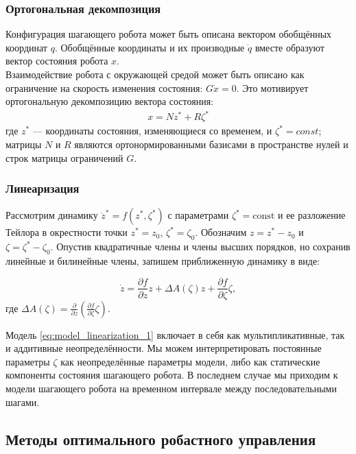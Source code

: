 \begin{frame}
    \frametitle{Ортогональная декомпозиция}
    Конфигурация шагающего робота может быть описана вектором обобщённых координат $q$. Обобщённые координаты и их производные $\dot{q}$ вместе образуют вектор состояния робота $x$. \\
    
    Взаимодействие робота с окружающей средой может быть описано как ограничение на скорость изменения состояния: ${G}\dot{x}= 0$. Это мотивирует ортогональную декомпозицию вектора состояния:
    \begin{align}\label{eq:1}
    	{x}= {N} {z}^* + {R} {\zeta}^*
    \end{align}
    где ${z}^*$ --- координаты состояния, изменяющиеся со временем, и ${\zeta}^* = const$; матрицы ${N}$ и ${R}$ являются ортонормированными базисами в пространстве нулей и строк матрицы ограничений ${G}$.
\end{frame}

\begin{frame}
	\frametitle{Линеаризация}
	Рассмотрим динамику $\dot z^* = f(z^*, \zeta^*)$ с параметрами $\zeta^* = \text{const}$ и ее разложение Тейлора в окрестности точки $z^* = z_0$, $\zeta^* = \zeta_0$. Обозначим $z = z^* - z_0$ и $\zeta = \zeta^* - \zeta_0$.
	Опустив квадратичные члены и члены высших порядков, но сохранив линейные и билинейные члены, запишем приближенную динамику в виде:
	
	\begin{equation}
		\label{eq:model_linearization_1}
		\dot z = \frac{\partial f}{\partial z} z + \Delta {A}(\zeta) z + \frac{\partial f}{\partial \zeta} \zeta,
	\end{equation}
	где $\Delta {A}(\zeta) = \frac{\partial}{\partial z} (\frac{\partial f}{\partial \zeta} \zeta)$.
	
	\vfill
	
	Модель \eqref{eq:model_linearization_1} включает в себя как мультипликативные, так и аддитивные неопределённости. Мы можем интерпретировать постоянные параметры $\zeta$ как неопределённые параметры модели, либо как статические компоненты состояния шагающего робота. В последнем случае мы приходим к модели шагающего робота на временном интервале между последовательными шагами.
\end{frame}

\subsection{Методы оптимального робастного управления}

